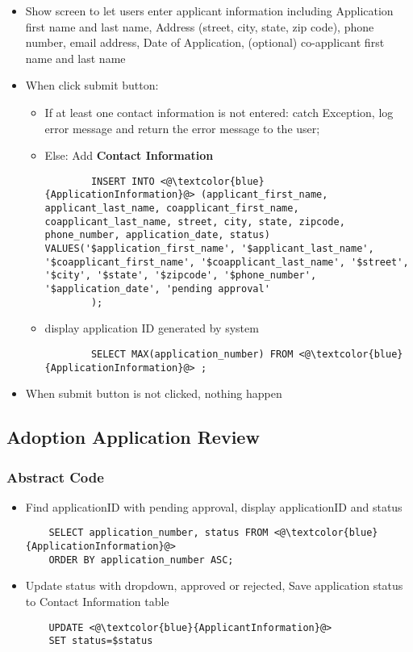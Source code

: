 \documentclass[a4paper]{article}
\begin{document}
\begin{itemize}
	\item Show screen to let users enter applicant information including Application first name and last name, Address (street, city, state, zip code), phone number, email address, Date of Application, (optional) co-applicant first name and last name
	\item When click submit button:
	\begin{itemize}
	    \item If at least one contact information is not entered: catch Exception, log error message and return the error message to the user;
	    \item Else: Add \textbf{Contact Information}
	    \begin{lstlisting}
    	INSERT INTO <@\textcolor{blue}{ApplicationInformation}@> (applicant_first_name, applicant_last_name, coapplicant_first_name, coapplicant_last_name, street, city, state, zipcode, phone_number, application_date, status) VALUES('$application_first_name', '$applicant_last_name', '$coapplicant_first_name', '$coapplicant_last_name', '$street', '$city', '$state', '$zipcode', '$phone_number', '$application_date', 'pending approval'
    	);
    	\end{lstlisting}
    	\item  display application ID generated by system
    	 \begin{lstlisting}
    	SELECT MAX(application_number) FROM <@\textcolor{blue}{ApplicationInformation}@> ;
    	\end{lstlisting}


	\end{itemize}
	\item When submit button is not clicked, nothing happen

\end{itemize}



\hypertarget{adoption_app_review}{\subsection{Adoption Application Review}}

\subsubsection*{Abstract Code}

\begin{itemize}
	\item Find applicationID with pending approval, display applicationID and status
	\begin{lstlisting}
	SELECT application_number, status FROM <@\textcolor{blue}{ApplicationInformation}@>
	ORDER BY application_number ASC;
	\end{lstlisting}

	\item Update status with dropdown, approved or rejected, Save application status to Contact Information table
	\begin{lstlisting}
	UPDATE <@\textcolor{blue}{ApplicantInformation}@>
	SET status=$status
	\end{lstlisting}
\end{itemize}
\end{document}

